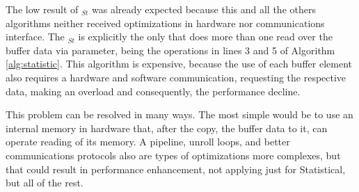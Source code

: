     
        The low result of \Ss$_{St}$ was already expected because this and all the others algorithms neither received optimizations in hardware nor communications interface. 
        The \Ss$_{St}$ is explicitly the only that does more than one read over the buffer data via parameter, being the operations in lines 3 and 5 of Algorithm \ref{alg:statistic}.
        This algorithm is expensive, because the use of each buffer element also requires a hardware and software communication, requesting the respective data, making an overload and consequently, the performance decline.
        
        
        This problem can be resolved in many ways.
        The most simple would be to use an internal memory in hardware that, after the copy, the buffer data to it, can operate reading of its memory.
        A pipeline, unroll loops, and better communications protocols also are types of optimizations more complexes, but that could result in performance enhancement, not applying just for Statistical, but all of the rest.
        